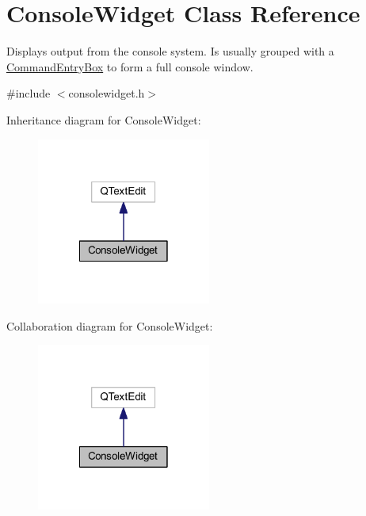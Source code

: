 \hypertarget{class_console_widget}{\section{Console\-Widget Class Reference}
\label{class_console_widget}
}


Displays output from the console system. Is usually grouped with a \hyperlink{class_command_entry_box}{Command\-Entry\-Box} to form a full console window.  




{\ttfamily \#include $<$consolewidget.\-h$>$}



Inheritance diagram for Console\-Widget\-:\nopagebreak
\begin{figure}[H]
\begin{center}
\leavevmode
\includegraphics[width=162pt]{class_console_widget__inherit__graph}
\end{center}
\end{figure}


Collaboration diagram for Console\-Widget\-:\nopagebreak
\begin{figure}[H]
\begin{center}
\leavevmode
\includegraphics[width=162pt]{class_console_widget__coll__graph}
\end{center}
\end{figure}
